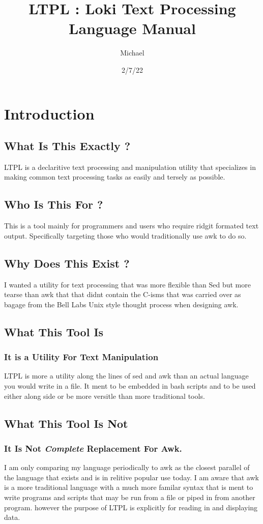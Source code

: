 \documentclass[11pt]{article}
\author{Michael}
\date{2/7/22}
\title{LTPL : Loki Text Processing Language Manual}
\begin{document}
\maketitle
\tableofcontents

\section{Introduction}
\label{sec:org8ac106c}
\subsection{What Is This Exactly ?}
\label{sec:orgded9922}
LTPL is a declaritive text processing and manipulation utility that specializes in making common
text processing tasks as easily and tersely as possible.
\subsection{Who Is This For ?}
\label{sec:orgece204b}
This is a tool mainly for programmers and users who require ridgit formated text output. Specifically targeting
those who would traditionally use awk to do so.
\subsection{Why Does This Exist ?}
\label{sec:org00aa4bc}
I wanted a utility for text processing that was more flexible than Sed but more tearse than awk that
that didnt contain the C-isms that was carried over as bagage from the Bell Labs Unix style thought process when designing awk.
\subsection{What This Tool Is}
\label{sec:orga2e4cc1}
\subsubsection{It is a Utility For Text Manipulation}
\label{sec:orgb96ddb8}
LTPL is more a utility along the lines of sed and awk than an actual language you would write in a file.
It ment to be embedded in bash scripts and to be used either along side or be more versitle than more traditional tools.
\subsection{What This Tool Is Not}
\label{sec:org77fd879}
\subsubsection{It Is Not \emph{Complete} Replacement For Awk.}
\label{sec:orgef9c61d}
I am only comparing my language periodically to awk as the closest parallel of the language that exists and is in relitive popular use today.
I am aware that awk is a more traditional language with a much more familar syntax that is ment to write programs and scripts that may be run from a file or piped in from another program.
however the purpose of LTPL is explicitly for reading in and displaying data.
\end{document}

